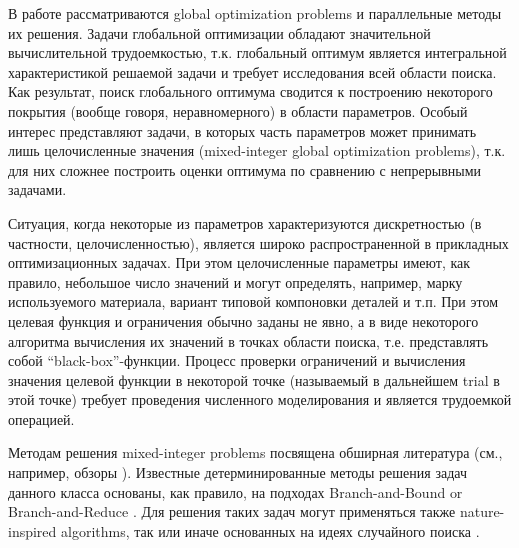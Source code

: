 \documentclass[
11pt,%
tightenlines,%
twoside,%
onecolumn,%
nofloats,%
nobibnotes,%
nofootinbib,%
superscriptaddress,%
noshowpacs,%
centertags]%
{revtex4}
\begin{document}
В работе рассматриваются global optimization problems и параллельные методы их решения. Задачи глобальной оптимизации обладают значительной вычислительной трудоемкостью, т.к. глобальный оптимум является интегральной характеристикой решаемой задачи и требует исследования всей области поиска. Как результат, поиск глобального оптимума сводится к построению некоторого покрытия (вообще говоря, неравномерного) в области параметров. Особый интерес представляют задачи, в которых часть параметров может принимать лишь целочисленные значения (mixed-integer global optimization problems), т.к. для них сложнее построить оценки оптимума по сравнению с непрерывными задачами.

Ситуация, когда некоторые из параметров характеризуются дискретностью (в частности, целочисленностью), является широко распространенной в прикладных оптимизационных задачах. При этом целочисленные параметры имеют, как правило, небольшое число значений и могут определять, например, марку используемого материала, вариант типовой компоновки деталей и т.п. 
При этом целевая функция и ограничения обычно заданы не явно, а в виде некоторого алгоритма вычисления их значений в точках области поиска, т.е. представлять собой “black-box”-функции. Процесс проверки ограничений и вычисления значения целевой функции в некоторой точке (называемый в дальнейшем trial в этой точке) требует проведения численного моделирования и является трудоемкой операцией. 

Методам решения mixed-integer problems посвящена обширная литература (см., например, обзоры \cite{Burer,Boukouvala}). Известные детерминированные методы решения задач данного класса основаны, как правило, на подходах Branch-and-Bound \cite{Belotti} or Branch-and-Reduce \cite{Vigerske}. Для решения таких задач могут применяться также nature-inspired algorithms, так или иначе основанных на идеях случайного поиска \cite{Deep,Schluter}.


\end{document}
